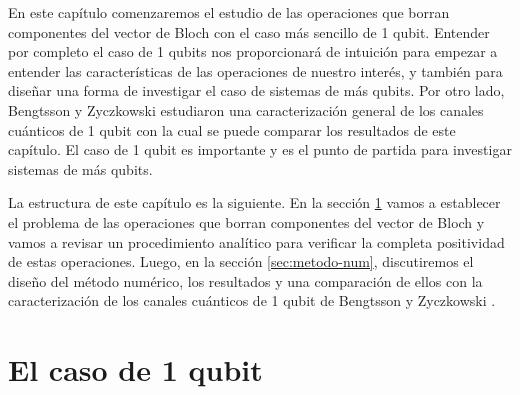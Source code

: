 En este capítulo comenzaremos el estudio de las operaciones que 
borran componentes del vector de Bloch con el caso más sencillo de 
1 qubit. Entender por completo el caso de 1 qubits nos proporcionará 
de intuición para empezar a entender las características de las operaciones
de nuestro interés, y también para diseñar una forma de investigar
el caso de sistemas de más qubits. Por otro lado, Bengtsson y Zyczkowski
\cite{bengtsson_zyczkowski_2017} estudiaron 
una caracterización general de los canales cuánticos de 
1 qubit con la cual se puede comparar los resultados de este capítulo. El caso
de 1 qubit es importante y es el punto de partida para investigar sistemas de
más qubits.

La estructura de este capítulo es la siguiente. 
En la sección \ref{sec:caso-1-qubit} vamos a establecer el problema 
de las operaciones que borran componentes del vector de Bloch y 
vamos a revisar un procedimiento analítico para verificar 
la completa positividad de estas operaciones.  
Luego, en la sección \ref{sec:metodo-num},
discutiremos el diseño del método numérico, los resultados y 
una comparación de ellos con la caracterización de los canales 
cuánticos de 1 qubit de Bengtsson y Zyczkowski 
\cite{bengtsson_zyczkowski_2017}.

\section{El caso de 1 qubit} \label{sec:caso-1-qubit} %

% 
% 

